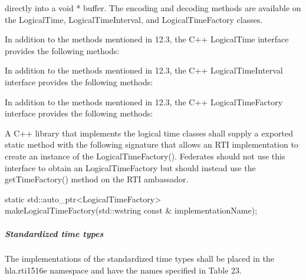 \clearpage

\begin{compactstdpage}
    directly into a void * buffer. The encoding and decoding methods are available on the LogicalTime, LogicalTimeInterval, and LogicalTimeFactory classes.

    In addition to the methods mentioned in 12.3, the C++ LogicalTime interface provides the following methods:

    In addition to the methods mentioned in 12.3, the C++ LogicalTimeInterval interface provides the following methods:

    In addition to the methods mentioned in 12.3, the C++ LogicalTimeFactory interface provides the following methods:

    A C++ library that implements the logical time classes shall supply a exported static method with the following signature that allows an RTI implementation to create an instance of the LogicalTimeFactory(). Federates should not use this interface to obtain an LogicalTimeFactory but should instead use the getTimeFactory() method on the RTI ambassador.

        {\ttfamily\fontsize{8.3}{9.6}\selectfont
    static std::auto\_ptr\textless{}LogicalTimeFactory\textgreater{}\\
    makeLogicalTimeFactory(std::wstring const \& implementationName);}

    \subparagraph{Standardized time types}

    The implementations of the standardized time types shall be placed in the hla.rti1516e namespace and have the names specified in Table 23.

    \cxiitabletwentythree

\end{compactstdpage}

